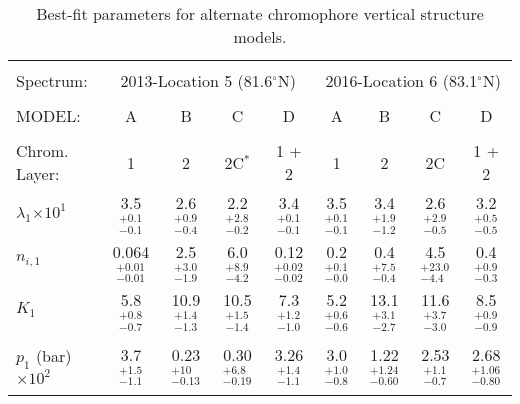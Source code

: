 \documentclass[article,11pt]{emulateapj}
\def\degx{$^\circ$}
\begin{document}
\begin{table*}[!htb]\centering
\caption{Best-fit parameters for alternate chromophore vertical structure models.}\label{Tbl:chromcomp}
\renewcommand{\baselinestretch}{0.8}
\begin{footnotesize}
\setlength\tabcolsep{2pt}
\begin{tabular}{|l | c c c c | c c c c|}
\hline\\[-0.05in]
Spectrum:  & \multicolumn{4}{c|}{2013-Location 5 (81.6\degx N)} &\multicolumn{4}{c|}{2016-Location 6 (83.1\degx N)} \\[0.05in]
\hline\\[-0.05in]
MODEL:   & A & B & C & D  & A & B & C & D   \\[0.05in]
\hline\\[-0.05in]
   Chrom. Layer:    &          1            &        2      &    2C$^*$      & 1 + 2  &     1          & 2  &  2C   & 1 + 2     \\[0.05in]
       $\lambda_1$$\times 10^1$ &   3.5$^{+  0.1}_{-  0.1}$ &   2.6$^{+ 0.9}_{- 0.4}$ &   2.2$^{+ 2.8}_{- 0.2}$ &   3.4$^{+ 0.1}_{- 0.1}$ &   3.5$^{+ 0.1}_{- 0.1}$ &   3.4$^{+ 1.9}_{- 1.2}$ &   2.6$^{+ 2.9}_{- 0.5}$ &   3.2$^{+ 0.5}_{- 0.5}$\\[0.05in]
                    $n_{i,1}$ &   0.064$^{+  0.01}_{-  0.01}$ &   2.5$^{+ 3.0}_{- 1.9}$ &   6.0$^{+ 8.9}_{- 4.2}$ &   0.12$^{+ 0.02}_{- 0.02}$ &   0.2$^{+ 0.1}_{- 0.0}$ &   0.4$^{+ 7.5}_{- 0.4}$ &   4.5$^{+23.0}_{- 4.4}$ &   0.4$^{+ 0.9}_{- 0.3}$\\[0.05in]
                      $K_1$ &   5.8$^{+  0.8}_{-  0.7}$ &  10.9$^{+ 1.4}_{- 1.3}$ &  10.5$^{+ 1.5}_{- 1.4}$ &   7.3$^{+ 1.2}_{- 1.0}$ &   5.2$^{+ 0.6}_{- 0.6}$ &  13.1$^{+ 3.1}_{- 2.7}$ &  11.6$^{+ 3.7}_{- 3.0}$ &   8.5$^{+ 0.9}_{- 0.9}$\\[0.05in]
\hline\\[-0.1in]
 $p_1$ (bar)$\times 10^2$ &   3.7$^{+  1.5}_{-  1.1}$ &  0.23$^{+10}_{-0.13}$&  0.30$^{+6.8}_{-0.19}$ & 3.26$^{+1.4}_{-1.1}$ &  3.0$^{+ 1.0}_{- 0.8}$ &  1.22$^{+1.24}_{-0.60}$  &  2.53$^{+1.1}_{-0.7}$ & 2.68$^{+1.06}_{-0.80}$ \\[0.05in]
$$
\end{tabular}
\end{footnotesize}
\end{table*}
\end{document}

